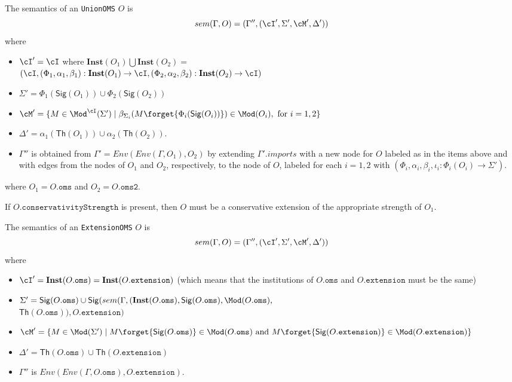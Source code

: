 \documentclass[10pt, a4paper]{isov2}
\newcommand*{\syntax}[1]{\texttt{#1}}
\newcommand{\Sig}{\mathsf{Sig}}
\renewcommand{\Th}{\mathsf{Th}}
\newcommand{\Inst}{\ensuremath{\mathbf{Inst}}}
\begin{document}
The semantics of an \syntax{UnionOMS} $O$ is
$$sem(\Gamma, O) = (\Gamma'',(\cI',\Sigma',\cM',\Delta'))$$
\noindent where
\begin{itemize}
  \item $\cI' = \cI$ where
    $\Inst(O_1) \bigcup \Inst(O_2) =$  \\$ (\cI, (\Phi_1, \alpha_1,\beta_1) : \Inst(O_1) \rightarrow \cI,
                    (\Phi_2, \alpha_2,\beta_2) : \Inst(O_2) \rightarrow \cI)$
  \item $\Sigma' = \Phi_1(\Sig(O_1)) \cup \Phi_2(\Sig(O_2))$
  \item $\cM' = \{ M\in \Mod^\cI(\Sigma') \mid \beta_{\Sigma_i}(M\forget{\Phi_i(\Sig(O_i))}) \in \Mod(O_i), \text{ for } i=1,2 \}$
  \item $\Delta' = \alpha_1(\Th(O_1)) \cup \alpha_2(\Th(O_2))$.
    \item
        $\Gamma''$ is obtained from
       $\Gamma' = Env(Env(\Gamma,O_1), O_2)$
       by extending $\Gamma'.imports$
       with a new node for $O$ labeled as in the items above and
       with edges from the nodes of $O_1$ and $O_2$,
       respectively, to the node of $O$,
        labeled for each $i=1,2$ with
        $(\Phi_i, \alpha_i,\beta_i, \iota_i: \Phi_i(O_i) \to \Sigma')$.
\end{itemize}
where $O_1 = O.\syntax{oms}$ and $O_2 = O.\syntax{oms2}$.

If $O.\syntax{conservativityStrength}$ is present, then $O$ must be a conservative extension
of the appropriate strength of $O_1$.


The semantics of an \syntax{ExtensionOMS} $O$ is
$$sem(\Gamma, O) = (\Gamma'',(\cI',\Sigma',\cM',\Delta'))$$
\noindent where
\begin{itemize}
  \item $\cI' = \Inst(O.\syntax{oms}) = \Inst(O.\syntax{extension})$
  (which means that
  the institutions of $O.\syntax{oms}$ and
  $O.\syntax{extension}$ must be the same)
  \item $\Sigma' = \Sig(O.\syntax{oms}) \cup
  \Sig(sem(\Gamma,
       (\Inst(O.\syntax{oms}), \Sig(O.\syntax{oms}), \Mod(O.\syntax{oms}),$ \\ $ \Th(O.\syntax{oms}) ),
  O.\syntax{extension})$
  \item $\cM' = \{ M\in \Mod(\Sigma') \mid M\forget{\Sig(O.\syntax{oms})} \in \Mod(O.\syntax{oms})
  \text{ and }
  M \forget{\Sig(O.\syntax{extension})} \in \Mod(O.\syntax{extension})\}$
  \item $\Delta' = \Th(O.\syntax{oms}) \cup \Th(O.\syntax{extension})$
  \item $\Gamma''$ is $Env(Env(\Gamma, O.\syntax{oms}), O.\syntax{extension})$.
\end{itemize}
\end{document}
